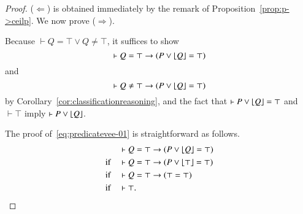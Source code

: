 \documentclass{article}
\theoremstyle{plain}
\DeclarePairedDelimiter\floor{\lfloor}{\rfloor}
\begin{document}
\begin{proof}
($\Leftarrow$) is obtained immediately by the remark of Proposition~\ref{prop:p->ceilp}. We now prove ($\Rightarrow$). 

Because $\vdash Q = \top \vee Q \neq \top$, it suffices to show
\begin{equation} \label{eq:predicatevee-01}
\vdash Q = \top \to (P \vee \floor*{Q} = \top)
\end{equation}
and
\begin{equation} \label{eq:predicatevee-02}
\vdash Q \neq \top \to (P \vee \floor*{Q} = \top)
\end{equation}
by Corollary~\ref{cor:classificationreasoning}, and the fact that $\vdash P \vee \floor*{Q} = \top$ and $\vdash \top$ imply $\vdash P \vee \floor*{Q}$. 

The proof of~\eqref{eq:predicatevee-01} is straightforward as follows.
\begin{align*}
&\vdash Q = \top \to (P \vee \floor*{Q} = \top) \\
\text{if} \quad &\vdash Q = \top \to (P \vee \floor*{\top} = \top) \\
\text{if} \quad &\vdash Q = \top \to (\top = \top) \\
\text{if} \quad &\vdash \top.
\end{align*}


\end{proof}
\end{document}
